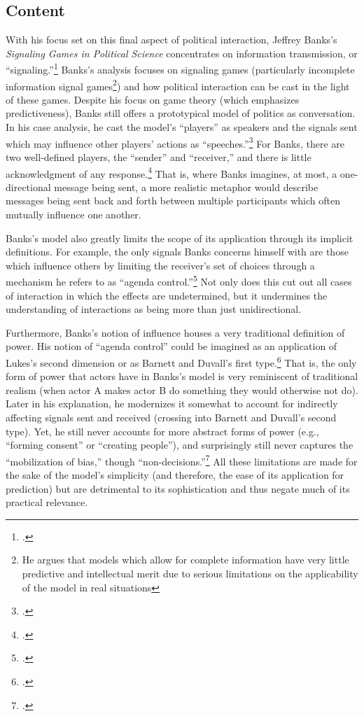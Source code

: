 \documentclass[openany,twoside]{memoir}
\begin{document}
\begin{Spacing}{2}
\subsection{Content}
With his focus set on this final aspect of political interaction, Jeffrey Banks's \emph{Signaling Games in Political Science} concentrates on information transmission, or ``signaling.''\footcite{banks91} 
Banks's analysis focuses on signaling games (particularly incomplete information signal games\footnote{
He argues that models which allow for complete information have very little predictive and intellectual merit due to serious limitations on the applicability of the model in real situations})
and how political interaction can be cast in the light of these games. 
Despite his focus on game theory (which emphasizes predictiveness), Banks still offers a prototypical model of politics as conversation. 
In his case analysis, he cast the model's ``players'' as speakers and the signals sent which may influence other players' actions as ``speeches.''\footcite[37]{banks91} 
For Banks, there are two well-defined players, the ``sender'' and ``receiver,'' and there is little acknowledgment of any response.\footcite[4]{banks91} 
That is, where Banks imagines, at most, a one-directional message being sent, a more realistic metaphor would describe messages being sent back and forth between multiple participants which often mutually influence one another. 

Banks's model also greatly limits the scope of its application through its implicit definitions. 
For example, the only signals Banks concerns himself with are those which influence others by limiting the receiver's set of choices through a mechanism he refers to as ``agenda control.''\footcite[3]{banks91} 
Not only does this cut out all cases of interaction in which the effects are undetermined, but it undermines the understanding of interactions as being more than just unidirectional. 

Furthermore, Banks's notion of influence houses a very traditional definition of power.
His notion of ``agenda control'' could be imagined as an application of Lukes's second dimension or as Barnett and Duvall's first type.\footcite{lukes05, barnettduvall05}
That is, the only form of power that actors have in Banks's model is very reminiscent of traditional realism (when actor A makes actor B do something they would otherwise not do).
Later in his explanation, he modernizes it somewhat to account for indirectly affecting signals sent and received (crossing into Barnett and Duvall's second type).
Yet, he still never accounts for more abstract forms of power (e.g., ``forming consent'' or ``creating people''), and surprisingly still never captures the ``mobilization of bias,'' though ``non-decisions.''\footcite{schattschneider75}
All these limitations are made for the sake of the model's simplicity (and therefore, the ease of its application for prediction) but are detrimental to its sophistication and thus negate much of its practical relevance.


\end{Spacing}
\end{document}
